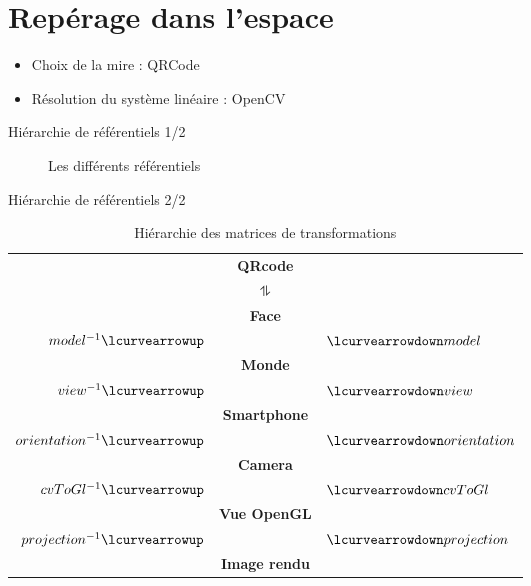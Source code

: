 \documentclass{beamer}
\newcommand*{\rootPath}{}
\begin{document}
\section{Repérage dans l'espace}
\begin{frame}
	\begin{itemize}[<+->]
		\item Choix de la mire : QRCode
		\item Résolution du système linéaire : OpenCV
	\end{itemize}
\end{frame}
\begin{frame}{Hiérarchie de référentiels 1/2}
	\begin{figure}[!ht]
		\centering
		
		\caption{Les différents référentiels}
		\label{fig:tikz:spaceHierarchie}
	\end{figure}	
\end{frame}	
\begin{frame}{Hiérarchie de référentiels 2/2}
	\begin{table}[!ht]
		\centering
		\begin{tabular}{rcl}
																				& \textbf{QRcode}				&																\\
			$ $																& $\updownharpoons$			& $ $														\\
																				& \textbf{Face}					&																\\
			$model^{-1}				\lcurvearrowup$	&												& $\lcurvearrowdown model$			\\
																				& \textbf{Monde}				&																\\
			$view^{-1}				\lcurvearrowup$	& 											& $\lcurvearrowdown view$				\\
																				& \textbf{Smartphone}		&																\\
			$orientation^{-1}	\lcurvearrowup$	& 											& $\lcurvearrowdown orientation$\\
																				& \textbf{Camera}				&																\\
			$cvToGl^{-1}			\lcurvearrowup$	& 											& $\lcurvearrowdown cvToGl $		\\
																				& \textbf{Vue OpenGL}		&																\\
			$projection^{-1}	\lcurvearrowup$	&												& $\lcurvearrowdown projection$	\\
																				& \textbf{Image rendu}	&
		\end{tabular}
		\caption{Hiérarchie des matrices de transformations}
		\label{ref:table:hierarchie}
	\end{table}
\end{frame}
\end{document}
